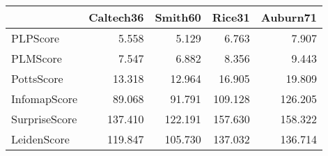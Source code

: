 \begin{tabular}{lrrrr}
\toprule
{} & Caltech36 & Smith60 &  Rice31 & Auburn71 \\
\midrule
PLPScore      &     5.558 &   5.129 &   6.763 &    7.907 \\
PLMScore      &     7.547 &   6.882 &   8.356 &    9.443 \\
PottsScore    &    13.318 &  12.964 &  16.905 &   19.809 \\
InfomapScore  &    89.068 &  91.791 & 109.128 &  126.205 \\
SurpriseScore &   137.410 & 122.191 & 157.630 &  158.322 \\
LeidenScore   &   119.847 & 105.730 & 137.032 &  136.714 \\
\bottomrule
\end{tabular}
